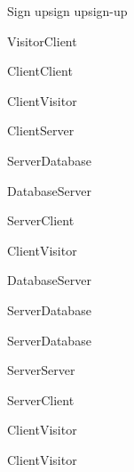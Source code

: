 \begin{sdfig}{Sign up}{sign up}{sign-up}

	\begin{umlcall}[op={Sign up}]{Visitor}{Client}
		\begin{umlcall}[op={Validate}]{Client}{Client}
			\begin{umlfragment}[type=alt, label=valid]
				\begin{umlcall}[type=return,op={Loading}]{Client}{Visitor}
					\begin{umlcall}[op={Sign up}]{Client}{Server}
						\begin{umlcall}[op={Has user}]{Server}{Database}
							\begin{umlfragment}[type=alt, label=true]
								\begin{umlcall}[type=return,op={Yes}]{Database}{Server}
									\begin{umlcall}[type=return,op={Error}]{Server}{Client}
										\begin{umlcall}[type=return,op={Error}]{Client}{Visitor}
										\end{umlcall}
									\end{umlcall}
								\end{umlcall}
								\umlfpart[else]
								\begin{umlcall}[type=return,op={No}]{Database}{Server}
									\begin{umlcall}[op={Create user}]{Server}{Database}
									\end{umlcall}
									\begin{umlcall}[op={Create OTP}]{Server}{Database}
										\begin{umlcall}[op={Send email}]{Server}{Server}
											\begin{umlcall}[type=return,op={Done}]{Server}{Client}
												\begin{umlcall}[type=return,op={Done}]{Client}{Visitor}
												\end{umlcall}
											\end{umlcall}
										\end{umlcall}
									\end{umlcall}
								\end{umlcall}
							\end{umlfragment}
						\end{umlcall}
					\end{umlcall}
				\end{umlcall}
				\umlfpart[else]
				\begin{umlcall}[type=return,op={Error}]{Client}{Visitor}
				\end{umlcall}
			\end{umlfragment}
		\end{umlcall}
	\end{umlcall}
\end{sdfig}


